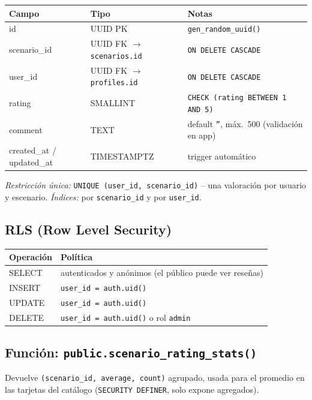 \documentclass[11pt,a4paper]{article}
\begin{document}
\begin{center}
\begin{tabularx}{\textwidth}{@{}>{\ttfamily}l>{\ttfamily}lX@{}}
\toprule
\textbf{\normalfont Campo} & \textbf{\normalfont Tipo} & \textbf{\normalfont Notas}\\
\midrule
id & UUID PK & \normalfont\texttt{gen\_random\_uuid()}\\
scenario\_id & UUID FK $\rightarrow$ \texttt{scenarios.id} & \normalfont\texttt{ON DELETE CASCADE}\\
user\_id & UUID FK $\rightarrow$ \texttt{profiles.id} & \normalfont\texttt{ON DELETE CASCADE}\\
rating & SMALLINT & \normalfont\texttt{CHECK (rating BETWEEN 1 AND 5)}\\
comment & TEXT & \normalfont default \texttt{''}, máx.\ 500 (validación en app)\\
created\_at / updated\_at & TIMESTAMPTZ & \normalfont trigger automático\\
\bottomrule
\end{tabularx}
\end{center}

\emph{Restricción única:} \texttt{UNIQUE (user\_id, scenario\_id)} -- una valoración por usuario
y escenario. \emph{Índices:} por \texttt{scenario\_id} y por \texttt{user\_id}.

\subsection{RLS (Row Level Security)}
\begin{center}
\begin{tabularx}{0.8\textwidth}{@{}>{\ttfamily}lX@{}}
\toprule
\textbf{\normalfont Operación} & \textbf{\normalfont Política}\\
\midrule
SELECT & \normalfont autenticados y anónimos (el público puede ver reseñas)\\
INSERT & \normalfont\texttt{user\_id = auth.uid()}\\
UPDATE & \normalfont\texttt{user\_id = auth.uid()}\\
DELETE & \normalfont\texttt{user\_id = auth.uid()} o rol \texttt{admin}\\
\bottomrule
\end{tabularx}
\end{center}

\subsection{Función: \texttt{public.scenario\_rating\_stats()}}
Devuelve \texttt{(scenario\_id, average, count)} agrupado, usada para el promedio en las tarjetas
del catálogo (\texttt{SECURITY DEFINER}, solo expone agregados).
\end{document}
